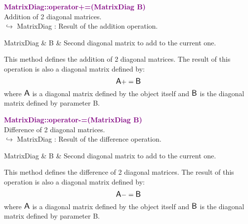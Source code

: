 \textcolor{purple}{\textbf{MatrixDiag::operator+=(MatrixDiag B)}}\label{MatrixDiag::operator+=(MatrixDiag B)}\\
Addition of 2 diagonal matrices.\\ \hspace*{10mm}$\hookrightarrow$ MatrixDiag : Result of the addition operation.

\begin{tcolorbox}[width=\textwidth,myArgs,tabularx={ll|R}]
MatrixDiag & B & Second diagonal matrix to add to the current one.
\end{tcolorbox}

This method defines the addition of 2 diagonal matrices.
The result of this operation is also a diagonal matrix defined by:
\begin{equation*}
\mbox{\large\ensuremath{\mathsf{A}}} += \mbox{\large\ensuremath{\mathsf{B}}}
\end{equation*}
where $\mbox{\large\ensuremath{\mathsf{A}}}$ is a diagonal matrix defined by the object itself and $\mbox{\large\ensuremath{\mathsf{B}}}$ is the diagonal matrix defined by parameter B.

\textcolor{purple}{\textbf{MatrixDiag::operator-=(MatrixDiag B)}}\label{MatrixDiag::operator-=(MatrixDiag B)}\\
Difference of 2 diagonal matrices.\\ \hspace*{10mm}$\hookrightarrow$ MatrixDiag : Result of the difference operation.

\begin{tcolorbox}[width=\textwidth,myArgs,tabularx={ll|R}]
MatrixDiag & B & Second diagonal matrix to add to the current one.
\end{tcolorbox}

This method defines the difference of 2 diagonal matrices.
The result of this operation is also a diagonal matrix defined by:
\begin{equation*}
\mbox{\large\ensuremath{\mathsf{A}}} -= \mbox{\large\ensuremath{\mathsf{B}}}
\end{equation*}
where $\mbox{\large\ensuremath{\mathsf{A}}}$ is a diagonal matrix defined by the object itself and $\mbox{\large\ensuremath{\mathsf{B}}}$ is the diagonal matrix defined by parameter B.

